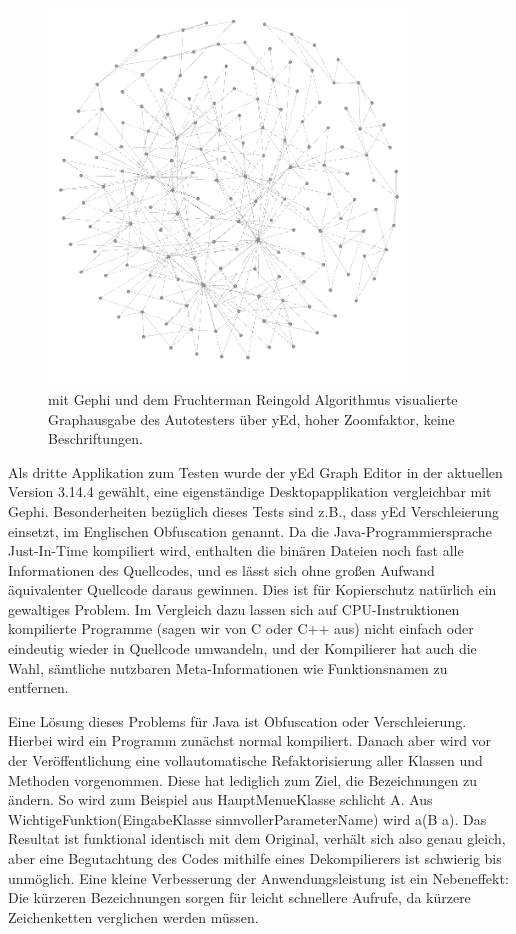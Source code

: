 \begin{figure}
	\centering
	\includegraphics[width=0.85\textwidth]{bilder/model_yed_notext_rf.png}
	\caption{mit Gephi und dem Fruchterman Reingold Algorithmus\cite{SPE:SPE4380211102}
    visualierte Graphausgabe des Autotesters über yEd, hoher Zoomfaktor, keine Beschriftungen.}
	\label{fig:screenshot_yed_rf}
\end{figure}

Als dritte Applikation zum Testen wurde der yEd Graph Editor 
in der aktuellen Version 3.14.4 gewählt,
eine eigenständige Desktopapplikation vergleichbar mit Gephi.
Besonderheiten bezüglich dieses Tests sind z.B., dass yEd Verschleierung
einsetzt, im Englischen Obfuscation genannt. Da die Java-Programmiersprache
Just-In-Time kompiliert wird, enthalten die \glqq{}binären\grqq{}
Dateien noch fast alle Informationen des Quellcodes, und es lässt sich ohne
großen Aufwand äquivalenter Quellcode daraus gewinnen. Dies ist für
Kopierschutz natürlich ein gewaltiges Problem. Im Vergleich dazu lassen
sich auf CPU-Instruktionen kompilierte Programme (sagen wir von C oder C++ aus)
nicht einfach oder eindeutig wieder in Quellcode umwandeln, und der Kompilierer
hat auch die Wahl, sämtliche nutzbaren Meta-Informationen wie Funktionsnamen
zu entfernen.

Eine Lösung dieses Problems für Java ist Obfuscation oder
Verschleierung. Hierbei wird ein Programm zunächst normal kompiliert. 
Danach aber wird vor der Veröffentlichung eine vollautomatische 
Refaktorisierung aller Klassen und Methoden vorgenommen.
Diese hat lediglich zum Ziel, die Bezeichnungen zu ändern. So wird
zum Beispiel aus \glqq{}HauptMenueKlasse\grqq{} schlicht \glqq{}A\grqq{}.
Aus \glqq{}WichtigeFunktion(EingabeKlasse sinnvollerParameterName)\grqq{}
wird \glqq{}a(B a)\grqq{}. Das Resultat ist funktional identisch mit dem
Original, verhält sich also genau gleich, aber eine Begutachtung des
Codes mithilfe eines Dekompilierers ist schwierig bis unmöglich.
Eine kleine Verbesserung der Anwendungsleistung ist ein Nebeneffekt:
Die kürzeren Bezeichnungen sorgen für leicht schnellere Aufrufe, da
kürzere Zeichenketten verglichen werden müssen.

